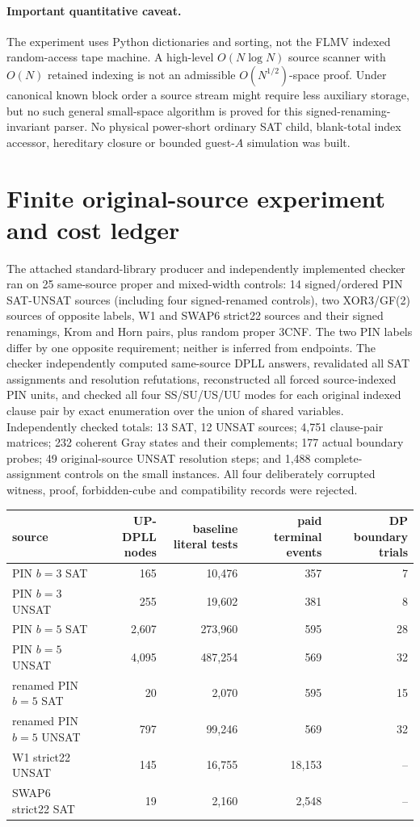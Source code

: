 \documentclass[11pt]{article}
\begin{document}
\paragraph{Important quantitative caveat.}
The experiment uses Python dictionaries and sorting, not the FLMV indexed random-access tape machine. A high-level $O(N\log N)$ source scanner with $O(N)$ retained indexing is not an admissible $O(N^{1/2})$-space proof. Under canonical known block order a source stream might require less auxiliary storage, but no such general small-space algorithm is proved for this signed-renaming-invariant parser. No physical power-short ordinary SAT child, blank-total index accessor, hereditary closure or bounded guest-$A$ simulation was built.

\section{Finite original-source experiment and cost ledger}
The attached standard-library producer and independently implemented checker ran on 25 same-source proper and mixed-width controls: 14 signed/ordered PIN SAT-UNSAT sources (including four signed-renamed controls), two XOR3/GF(2) sources of opposite labels, W1 and SWAP6 strict22 sources and their signed renamings, Krom and Horn pairs, plus random proper 3CNF. The two PIN labels differ by one opposite requirement; neither is inferred from endpoints. The checker independently computed same-source DPLL answers, revalidated all SAT assignments and resolution refutations, reconstructed all forced source-indexed PIN units, and checked all four SS/SU/US/UU modes for each original indexed clause pair by exact enumeration over the union of shared variables. Independently checked totals: 13 SAT, 12 UNSAT sources; 4,751 clause-pair matrices; 232 coherent Gray states and their complements; 177 actual boundary probes; 49 original-source UNSAT resolution steps; and 1,488 complete-assignment controls on the small instances. All four deliberately corrupted witness, proof, forbidden-cube and compatibility records were rejected.

\begin{center}\begin{tabular}{@{}lrrrr@{}}\toprule
source & UP-DPLL nodes & baseline literal tests & paid terminal events & DP boundary trials\\\midrule
PIN $b=3$ SAT &165&10,476&357&7\\
PIN $b=3$ UNSAT &255&19,602&381&8\\
PIN $b=5$ SAT &2,607&273,960&595&28\\
PIN $b=5$ UNSAT &4,095&487,254&569&32\\
renamed PIN $b=5$ SAT &20&2,070&595&15\\
renamed PIN $b=5$ UNSAT &797&99,246&569&32\\
W1 strict22 UNSAT &145&16,755&18,153&--\\
SWAP6 strict22 SAT &19&2,160&2,548&--\\\bottomrule\end{tabular}\end{center}
\end{document}

